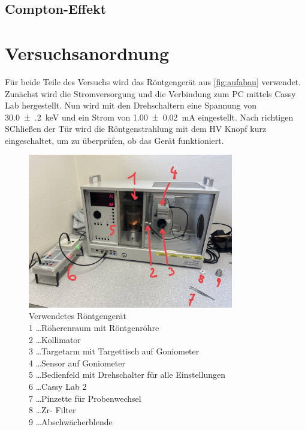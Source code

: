 \documentclass[12pt,english,ngerman]{scrartcl}
\begin{document}
\subsection{Compton-Effekt}



\section{Versuchsanordnung}\label{sec:versuchsanordnung}

Für beide Teile des Versuchs wird das Röntgengerät aus \autoref{fig:aufabau} verwendet.
Zunächst wird die Stromversorgung
und die Verbindung zum PC mittels Cassy Lab hergestellt. Nun wird mit den Drehschaltern eine
Spannung von \SI{30.0(2)}{\kilo eV} und ein Strom von \SI{1.00(2)}{mA} eingestellt.
Nach richtigen SChließen der Tür wird die Röntgenstrahlung mit dem HV Knopf kurz eingeschaltet,
um zu überprüfen, ob das Gerät funktioniert.

\begin{figure}[H]
	\begin{center}
		\includegraphics[width =0.8\textwidth]{./figures/aufbau.jpg}
	\end{center}
	\caption[Verwendetes Röntgengerät]
	{Verwendetes Röntgengerät\\
	1 \dots Röherenraum mit Röntgenröhre\\
	2 \dots Kollimator\\
	3 \dots Targetarm mit Targettisch auf Goniometer\\
	4 \dots Sensor auf Goniometer\\
	5 \dots Bedienfeld mit Drehschalter für alle Einstellungen\\
	6 \dots Cassy Lab 2\\
	7 \dots Pinzette für Probenwechsel\\
	8 \dots Zr- Filter\\
	9 \dots Abschwächerblende
	}\label{fig:aufabau}
\end{figure}
\end{document}
